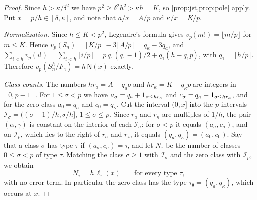 \begin{proof}
Since $h>\kappa/\delta^2$ we have $p^2\ge\delta^2h^2>\kappa h=K$, so \cref{prop:jet,prop:pole} apply. Put $x=p/h\in[\delta,\kappa]$, and note that $a/x=A/p$ and $\kappa/x=K/p$.

\emph{Normalization.} Since $h\le K<p^2$, Legendre's formula gives $v_p(m!)=\lfloor m/p\rfloor$ for $m\le K$. Hence $v_p(S_n)=\lfloor K/p\rfloor-3\lfloor A/p\rfloor=q_\kappa-3q_a$, and $\sum_{i<h}v_p(i!)=\sum_{i<h}\lfloor i/p\rfloor=p\,q_1(q_1-1)/2+q_1(h-q_1p)$, with $q_1=\lfloor h/p\rfloor$. Therefore $v_p(S_n^h/F_n)=h\,\mathsf N(x)$ exactly.

\emph{Class counts.} The numbers $hr_a=A-q_ap$ and $hr_\kappa=K-q_\kappa p$ are integers in $[0,p-1]$. For $1\le\sigma<p$ we have $a_\sigma=q_a+\mathbf{1}_{\sigma\le hr_a}$ and $c_\sigma=q_\kappa+\mathbf{1}_{\sigma\le hr_\kappa}$, and for the zero class $a_0=q_a$ and $c_0=q_\kappa$. Cut the interval $(0,x]$ into the $p$ intervals $\mathcal I_\sigma=((\sigma-1)/h,\sigma/h]$, $1\le\sigma\le p$. Since $r_a$ and $r_\kappa$ are multiples of $1/h$, the pair $(\alpha,\gamma)$ is constant on the interior of each $\mathcal I_\sigma$: for $\sigma<p$ it equals $(a_\sigma,c_\sigma)$, and on $\mathcal I_p$, which lies to the right of $r_a$ and $r_\kappa$, it equals $(q_a,q_\kappa)=(a_0,c_0)$. Say that a class $\sigma$ has type $\tau$ if $(a_\sigma,c_\sigma)=\tau$, and let $N_\tau$ be the number of classes $0\le\sigma<p$ of type $\tau$. Matching the class $\sigma\ge1$ with $\mathcal I_\sigma$ and the zero class with $\mathcal I_p$, we obtain
\begin{equation}\label{eq:class-counts}
N_\tau=h\,\ell_\tau(x)\qquad\text{for every type }\tau,
\end{equation}
with no error term. In particular the zero class has the type $\tau_0=(q_a,q_\kappa)$, which occurs at $x$.


\end{proof}
